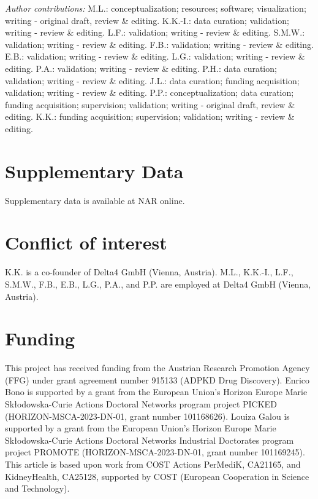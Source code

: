 \textit{Author contributions:} M.L.: conceptualization; resources; software; visualization; writing - original draft, review \& editing. K.K.-I.: data curation; validation; writing - review \& editing. L.F.: validation; writing - review \& editing. S.M.W.: validation; writing - review \& editing. F.B.: validation; writing - review \& editing. E.B.: validation; writing - review \& editing. L.G.: validation; writing - review \& editing. P.A.: validation; writing - review \& editing. P.H.: data curation; validation; writing - review \& editing. J.L.: data curation; funding acquisition; validation; writing - review \& editing. P.P.: conceptualization; data curation; funding acquisition; supervision; validation; writing - original draft, review \& editing. K.K.: funding acquisition; supervision; validation; writing - review \& editing.

\section{Supplementary Data}
Supplementary data is available at NAR online.

\section{Conflict of interest}
K.K. is a co-founder of Delta4 GmbH (Vienna, Austria). M.L., K.K.-I., L.F., S.M.W., F.B., E.B., L.G., P.A., and P.P. are employed at Delta4 GmbH (Vienna, Austria).

\section{Funding}
This project has received funding from the Austrian Research Promotion Agency (FFG) under grant agreement number 915133 (ADPKD Drug Discovery). Enrico Bono is supported by a grant from the European Union's Horizon Europe Marie Skłodowska-Curie Actions Doctoral Networks program project PICKED (HORIZON-MSCA-2023-DN-01, grant number 101168626). Louiza Galou is supported by a grant from the European Union's Horizon Europe Marie Skłodowska-Curie Actions Doctoral Networks Industrial Doctorates program project PROMOTE (HORIZON-MSCA-2023-DN-01, grant number 101169245). This article is based upon work from COST Actions PerMediK, CA21165, and KidneyHealth, CA25128, supported by COST (European Cooperation in Science and Technology).

